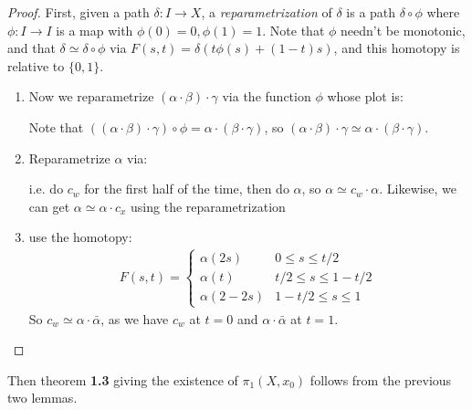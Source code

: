 \documentclass[10pt,a4paper]{article}
\begin{document}
\begin{proof}
First, given a path $\delta:I\rightarrow X$, a \emph{reparametrization} of $\delta$ is a path $\delta \circ \phi$ where $\phi:I\rightarrow I$ is a map with $\phi(0) = 0, \phi(1) = 1$. Note that $\phi$ needn't be monotonic, and that $\delta \simeq \delta \circ \phi$ via $F(s,t) = \delta(t\phi(s) + (1-t)s)$, and this homotopy is relative to $\{0,1\}$. 
\begin{enumerate}
\item Now we reparametrize $(\alpha \cdot \beta)\cdot \gamma$ via the function $\phi$ whose plot is:
\begin{center}
\end{center}
Note that $((\alpha\cdot \beta)\cdot \gamma)\circ \phi = \alpha\cdot(\beta\cdot\gamma)$, so $(\alpha\cdot\beta)\cdot\gamma \simeq \alpha\cdot(\beta\cdot\gamma)$.

\item Reparametrize $\alpha$ via:
\begin{center}
\end{center}
i.e. do $c_w$ for the first half of the time, then do $\alpha$, so $\alpha\simeq c_w\cdot \alpha$. Likewise, we can get $\alpha\simeq \alpha\cdot c_x$ using the reparametrization
\begin{center}
\end{center}
\item use the homotopy:
\begin{align*}
F(s,t) = \begin{cases} \alpha(2s) & 0\leq s\leq t/2 \\ \alpha(t) & t/2\leq s\leq 1-t/2 \\ \alpha(2-2s) & 1-t/2 \leq s \leq 1 \end{cases}
\end{align*}
So $c_w \simeq \alpha \cdot \bar{\alpha}$, as we have $c_w$ at $t=0$ and $\alpha\cdot\bar{\alpha}$ at $t=1$.
\end{enumerate}
\end{proof}
Then theorem \textbf{1.3} giving the existence of $\pi_1(X, x_0)$ follows from the previous two lemmas.
\end{document}

